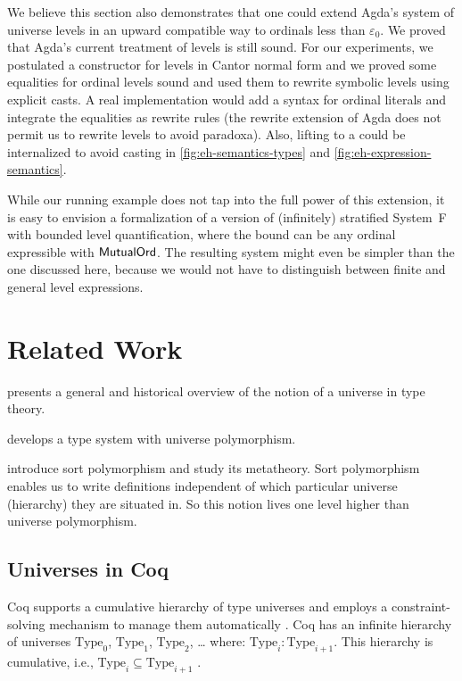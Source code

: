 \documentclass[manuscript,screen,review,anonymous]{acmart}
\begin{document}
We believe this section also demonstrates that one could extend Agda's
system of universe levels in an upward compatible way to ordinals less
than $\varepsilon_0$. We proved that Agda's current treatment of
levels is still sound. For our experiments, we postulated a
constructor for levels in Cantor normal form and we proved some
equalities for ordinal levels sound and used them to rewrite symbolic
levels using explicit casts. A real implementation would add a syntax
for ordinal literals and integrate the equalities as rewrite rules
(the rewrite extension of Agda does not permit us to rewrite levels to
avoid paradoxa). Also, lifting to a {\ABoundedLevel} could be
internalized to avoid casting in \cref{fig:eh-semantics-types} and
\cref{fig:eh-expression-semantics}. 


While our running example does not tap into the
full power of this extension, it is easy to envision a formalization
of a version of (infinitely) stratified System~F with bounded level quantification,
where the bound can be any ordinal expressible with $\AMutualOrd$. The
resulting system might even be simpler than the one discussed here,
because we would not have to distinguish between finite and general
level expressions.



\section{Related Work}
\label{sec:related-work}

\citet{10.1093/oso/9780198501275.003.0012} presents a general and
historical overview of the notion of a universe in type theory.

\citet{voevodsky14} develops a type system with universe polymorphism.

\citet{DBLP:conf/csl/Kovacs22}

\citet{DBLP:conf/types/BezemCDE22}

\citet{DBLP:journals/pacmpl/PoiretGMPSTT25} introduce sort
polymorphism and study its metatheory. Sort polymorphism enables us to
write definitions independent of which particular universe (hierarchy)
they are situated in. So this notion lives one level higher than
universe polymorphism.

\subsection{Universes in Coq}
\label{sec:universes-coq}

Coq supports a cumulative hierarchy of type universes and employs a
constraint-solving mechanism to manage them automatically \cite{DBLP:journals/pacmpl/SozeauBFTW20,DBLP:conf/itp/SozeauT14}. 
Coq has an infinite hierarchy of universes
\( \text{Type}_0 \), \( \text{Type}_1 \), \( \text{Type}_2 \), … where:
\(\text{Type}_i : \text{Type}_{i+1} \).
This hierarchy is cumulative, i.e., \(\text{Type}_i \subseteq \text{Type}_{i+1} \) .
\end{document}
